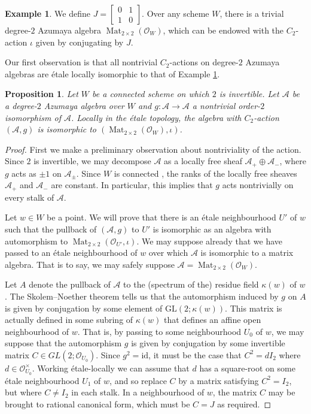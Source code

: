 \documentclass[reqno,oneside,dvipsnames,pdfnames,final]{amsart}
\newtheorem{prop}[thm]{Proposition}
\theoremstyle{definition}
\newtheorem{exmp}[thm]{Example}
\newcommand{\GL}{\mathrm{GL}}
\newcommand{\sh}[1]{\mathcal{#1}}
\newcommand{\Mat}{\operatorname{Mat}}
\newcommand{\id}{\mathrm{id}}
\begin{document}
\begin{exmp}\label{ex:standardAction}
  We define $J =
  \begin{bmatrix}
    0 & 1 \\ 1 & 0
  \end{bmatrix}$. Over any scheme $W$, there is a trivial degree-$2$ Azumaya algebra $\Mat_{2 \times 2}(\sh O_W)$, which can be endowed with the $C_2$-action $\iota$ given by conjugating by $J$.
\end{exmp}
Our first observation is that all nontrivial $C_2$-actions on degree-$2$ Azumaya algebras are étale locally isomorphic to that of Example \ref{ex:standardAction}.

\begin{prop} \label{pr:onlyOneOrder2ActionSHL}
  Let $W$ be a connected scheme on which $2$ is invertible. Let $\sh A$ be a degree-$2$ Azumaya algebra over $W$ and $g : \sh A \to \sh A$ a nontrivial order-$2$ isomorphism of $\sh A$. Locally in the étale topology, the algebra with $C_2$-action $(\sh A, g)$ is isomorphic to $(\Mat_{2 \times 2}(\sh O_W), \iota)$.
\end{prop}
\begin{proof}
  First we make a preliminary observation about nontriviality of the action. Since $2$ is invertible, we may decompose $\sh A$ as a locally free sheaf $\sh A_+ \oplus \sh A_{-}$, where $g$ acts as $\pm 1$ on $\sh A_{\pm}$. Since $W$ is connected , the ranks of the locally free sheaves $\sh A_+$ and $\sh A_-$ are constant. In particular, this implies that $g$ acts nontrivially on every stalk of $\sh A$.

  Let $w \in W$ be a point. We will prove that there is an étale neighbourhood $U'$ of $w$ such that the pullback of $(\sh A, g)$ to $U'$ is isomorphic as an algebra with automorphism to $\Mat_{2 \times 2}(\sh O_{U'}, \iota)$. We may suppose already that we have passed to an étale neighbourhood of $w$ over which $\sh A$ is isomorphic to a matrix algebra. That is to say, we may safely suppose $\sh A = \Mat_{2\times 2}(\sh O_W)$.

  Let $A$ denote the pullback of $\sh A$ to the (spectrum of the) residue field $\kappa(w)$ of $w$. The Skolem--Noether theorem tells us that the automorphism induced by $g$ on $A$ is given by conjugation by some element of $\GL(2; \kappa(w))$. This matrix is actually defined in some subring of $\kappa(w)$ that defines an affine open neighbourhood of $w$. That is, by passing to some neighbourhood $U_0$ of $w$, we may suppose that the automorphism $g$ is given by conjugation by some invertible matrix $C \in GL(2;\sh O_{U_0})$. Since $g^2 = \id$, it must be the case that $C^2= d I_2$ where $d\in \sh O^\times_{U_0}$. Working étale-locally we can assume that $d$ has a square-root on some étale neighbourhood $U_1$ of $w$, and so replace $C$ by a matrix satisfying $C^2 = I_2$, but where $C \neq I_2$ in each stalk. In a neighbourhood of $w$, the matrix $C$ may be brought to rational canonical form, which must be $C = J$ as required.
\end{proof}
\end{document}
